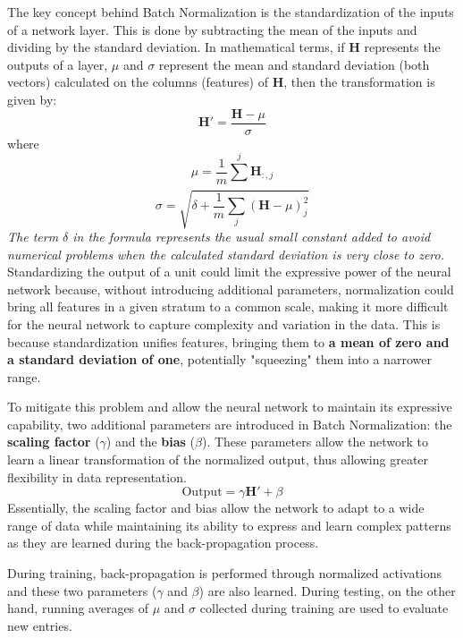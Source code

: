 The key concept behind Batch Normalization is the standardization of the inputs of a network layer. This is done by subtracting the mean of the inputs and dividing by the standard deviation. In mathematical terms, if $ \mathbf{H} $ represents the outputs of a layer, $ \mu $ and $ \sigma $ represent the mean and standard deviation (both vectors) calculated on the columns (features) of $ \mathbf{H} $, then the transformation is given by:
$$ \mathbf{H}' = \frac{\mathbf{H} - \mu}{\sigma} $$ where $$\mu = \frac{1}{m}\sum_{}^{j}\mathbf{H}_{:,j}$$
$$\sigma = \sqrt{\delta + \frac{1}{m}\sum_{j}^{}(\mathbf{H}-\mu)^2_j}$$
\textit{The term $\delta$ in the formula represents the usual small constant added to avoid numerical problems when the calculated standard deviation is very close to zero. }
Standardizing the output of a unit could limit the expressive power of the neural network because, without introducing additional parameters, normalization could bring all features in a given stratum to a common scale, making it more difficult for the neural network to capture complexity and variation in the data. This is because standardization unifies features, bringing them to \textbf{a mean of zero and a standard deviation of one}, potentially "squeezing" them into a narrower range.

To mitigate this problem and allow the neural network to maintain its expressive capability, two additional parameters are introduced in Batch Normalization: the \textbf{scaling factor} ($ \gamma $) and the \textbf{bias} ($ \beta $). These parameters allow the network to learn a linear transformation of the normalized output, thus allowing greater flexibility in data representation. 
$$\text{Output} = \gamma \mathbf{H}' + \beta $$
Essentially, the scaling factor and bias allow the network to adapt to a wide range of data while maintaining its ability to express and learn complex patterns as they are learned during the back-propagation process.

During training, back-propagation is performed through normalized activations and these two parameters ($\gamma$ and $\beta$) are also learned. During testing, on the other hand, running averages of $ \mu $ and $ \sigma $ collected during training are used to evaluate new entries.


